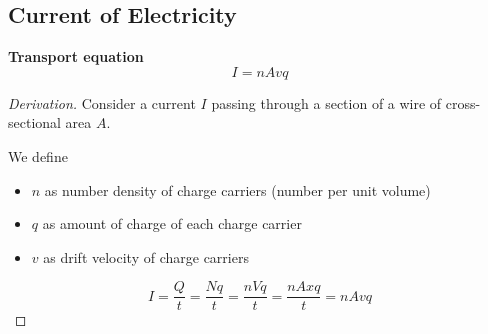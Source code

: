 \subsection{Current of Electricity}
\textbf{Transport equation}
\[ I=nAvq \]

\begin{proof}[Derivation]
Consider a current $I$ passing through a section of a wire of cross-sectional area $A$. 

We define
\begin{itemize}
\item $n$ as number density of charge carriers (number per unit volume)
\item $q$ as amount of charge of each charge carrier
\item $v$ as drift velocity of charge carriers
\end{itemize}
\[ I=\frac{Q}{t}=\frac{Nq}{t}=\frac{nVq}{t}=\frac{nAxq}{t}=nAvq \]
\end{proof}
\pagebreak